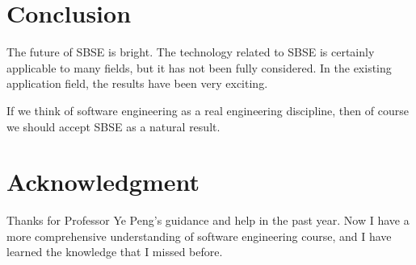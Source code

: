 \documentclass[conference]{IEEEtran}
\begin{document}
\section{Conclusion}

The future of SBSE is bright. The technology related to SBSE is 
certainly applicable to many fields, but it has not been fully 
considered. In the existing application field, the results have 
been very exciting.

If we think of software engineering as a real engineering discipline, 
then of course we should accept SBSE as a natural result.




\section*{Acknowledgment}


Thanks for Professor Ye Peng's guidance and help in the past year. 
Now I have a more comprehensive understanding of software engineering course, 
and I have learned the knowledge that I missed before.




%
%
%









\end{document}
